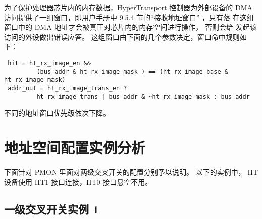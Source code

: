 为了保护处理器芯片内的内存数据，HyperTransport 控制器为外部设备的 DMA
访问提供了一组窗口，即用户手册中 9.5.4 节的“接收地址窗口” ，只有落
在这组窗口中的 DMA 地址才会被真正对芯片内的内存空间进行操作， 否则会给
发起该访问的外设做出错误应答。 这组窗口由下面的几个参数决定，窗口命中规则如下：
\begin{verbatim}
 hit = ht_rx_image_en &&
         (bus_addr & ht_rx_image_mask ) == (ht_rx_image_base & ht_rx_image_mask)
 addr_out = ht_rx_image_trans_en ?
         ht_rx_image_trans | bus_addr & ~ht_rx_image_mask : bus_addr
\end{verbatim}
不同的地址窗口优先级依次下降。

\section{地址空间配置实例分析}

下面针对 PMON 里面对两级交叉开关的配置分别予以说明。 以下的实例中， HT 设备使用
HT1 接口连接，HT0 接口悬空不用。

\subsection{一级交叉开关实例 1}

